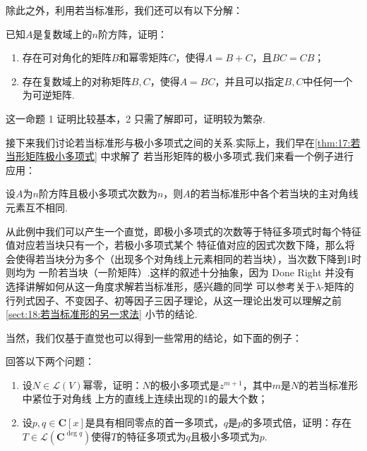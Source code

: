 除此之外，利用若当标准形，我们还可以有以下分解：
\begin{example}
    已知$A$是复数域上的$n$阶方阵，证明：
    \begin{enumerate}
        \item 存在可对角化的矩阵$B$和幂零矩阵$C$，使得$A=B+C$，且$BC=CB$；

        \item 存在复数域上的对称矩阵$B,C$，使得$A=BC$，并且可以指定$B,C$中任何一个为可逆矩阵.
    \end{enumerate}
\end{example}
这一命题 1 证明比较基本，2 只需了解即可，证明较为繁杂.

接下来我们讨论若当标准形与极小多项式之间的关系.实际上，我们早在\autoref{thm:17:若当形矩阵极小多项式} 中求解了
若当形矩阵的极小多项式.我们来看一个例子进行应用：
\begin{example}
    设$A$为$n$阶方阵且极小多项式次数为$n$，则$A$的若当标准形中各个若当块的主对角线元素互不相同.
\end{example}
从此例中我们可以产生一个直觉，即极小多项式的次数等于特征多项式时每个特征值对应若当块只有一个，若极小多项式某个
特征值对应的因式次数下降，那么将会使得若当块分为多个（出现多个对角线上元素相同的若当块），当次数下降到1时则均为
一阶若当块（一阶矩阵）.这样的叙述十分抽象，因为 Done Right 并没有选择讲解如何从这一角度求解若当标准形，感兴趣的同学
可以参考关于$\lambda$-矩阵的行列式因子、不变因子、初等因子三因子理论，从这一理论出发可以理解之前\autoref{sect:18:若当标准形的另一求法}
小节的结论.

当然，我们仅基于直觉也可以得到一些常用的结论，如下面的例子：
\begin{example}
    回答以下两个问题：
    \begin{enumerate}
        \item 设$N\in \mathcal{L}(V)$幂零，证明：$N$的极小多项式是$z^{m+1}$，其中$m$是$N$的若当标准形中紧位于对角线
        上方的直线上连续出现的1的最大个数；

        \item 设$p,q\in\mathbf{C}[x]$是具有相同零点的首一多项式，$q$是$p$的多项式倍，证明：存在
        $T\in \mathcal{L}(\mathbf{C}^{\deg q})$使得$T$的特征多项式为$q$且极小多项式为$p$.
    \end{enumerate}
\end{example}

